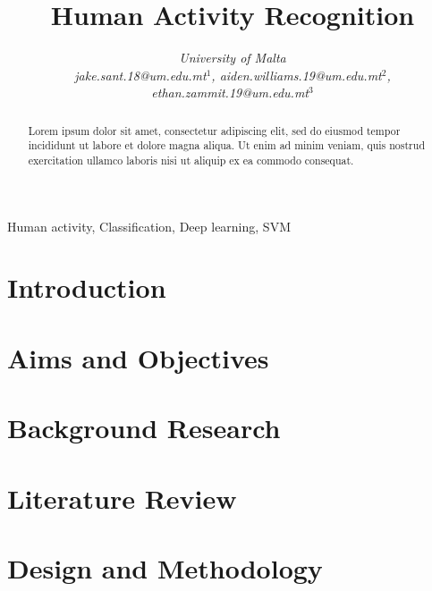 \documentclass[conference]{IEEEtran}
\begin{document}
\title{Human Activity Recognition}

\author{
\textit{University of Malta}\\
\textit{jake.sant.18@um.edu.mt$^{1}$, aiden.williams.19@um.edu.mt$^{2}$, ethan.zammit.19@um.edu.mt$^{3}$}}

  \maketitle

  \begin{abstract}
    Lorem ipsum dolor sit amet, consectetur adipiscing elit, sed do eiusmod tempor incididunt ut labore et dolore magna aliqua.
    Ut enim ad minim veniam, quis nostrud exercitation ullamco laboris nisi ut aliquip ex ea commodo consequat.
  \end{abstract}

  \begin{IEEEkeywords}
    Human activity, Classification, Deep learning, SVM

  \end{IEEEkeywords}

  \section{Introduction}
    

  \section{Aims and Objectives}
       

  \section{Background Research}
    

  \section{Literature Review}
    

  \section{Design and Methodology}
    \label{Design}
    
\end{document}
